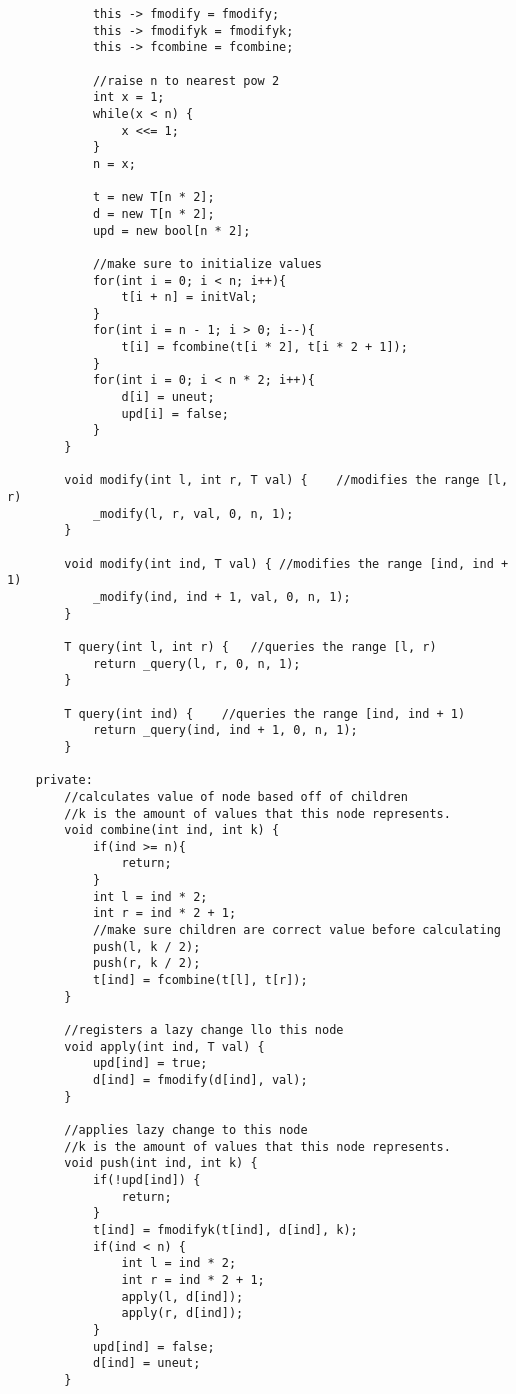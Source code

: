 \documentclass[8pt, headheight=10pt, a4paper]{article}
\begin{document}
\begin{multicols*}{3}
\begin{lstlisting}
            this -> fmodify = fmodify;
            this -> fmodifyk = fmodifyk;
            this -> fcombine = fcombine;

            //raise n to nearest pow 2
            int x = 1;
            while(x < n) {
                x <<= 1;
            }
            n = x;

            t = new T[n * 2];
            d = new T[n * 2];
            upd = new bool[n * 2];

            //make sure to initialize values
            for(int i = 0; i < n; i++){
                t[i + n] = initVal;
            }
            for(int i = n - 1; i > 0; i--){
                t[i] = fcombine(t[i * 2], t[i * 2 + 1]);
            }
            for(int i = 0; i < n * 2; i++){
                d[i] = uneut;
                upd[i] = false;
            }
        }

        void modify(int l, int r, T val) {    //modifies the range [l, r)
            _modify(l, r, val, 0, n, 1);
        }

        void modify(int ind, T val) { //modifies the range [ind, ind + 1)
            _modify(ind, ind + 1, val, 0, n, 1);
        }

        T query(int l, int r) {   //queries the range [l, r)
            return _query(l, r, 0, n, 1);
        }

        T query(int ind) {    //queries the range [ind, ind + 1)
            return _query(ind, ind + 1, 0, n, 1);
        }

    private:
        //calculates value of node based off of children
        //k is the amount of values that this node represents. 
        void combine(int ind, int k) {
            if(ind >= n){
                return;
            }
            int l = ind * 2;
            int r = ind * 2 + 1;
            //make sure children are correct value before calculating
            push(l, k / 2);
            push(r, k / 2);
            t[ind] = fcombine(t[l], t[r]);
        }

        //registers a lazy change llo this node
        void apply(int ind, T val) {
            upd[ind] = true;
            d[ind] = fmodify(d[ind], val);
        }

        //applies lazy change to this node
        //k is the amount of values that this node represents. 
        void push(int ind, int k) {
            if(!upd[ind]) {
                return;
            }
            t[ind] = fmodifyk(t[ind], d[ind], k);
            if(ind < n) {
                int l = ind * 2;
                int r = ind * 2 + 1;
                apply(l, d[ind]);
                apply(r, d[ind]);
            }
            upd[ind] = false;
            d[ind] = uneut;
        }


\end{lstlisting}
\end{multicols*}
\end{document}
